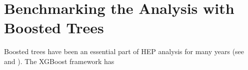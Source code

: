 \section{Benchmarking the Analysis with Boosted Trees}
Boosted trees have been an essential part of \ac{HEP} analysis for many years (see 
\cite{ATLAS-CONF-2011-152} and \cite{ATLAS-CONF-2017-064}). The XGBoost framework has


